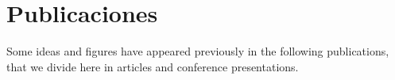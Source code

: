 \chapter*{Publicaciones}%
Some ideas and figures have appeared previously in the following publications, that we divide here in articles and conference presentations. 


\begin{refsection}[ownpubs]
    \small
    \nocite{*} %
    \newrefcontext[sorting=ydnt]
    \printbibliography[heading=subbibliography, title={Articles}, type=article]
    \printbibliography[heading=subbibliography, title={Conferences}, type=inproceedings]
\end{refsection}
